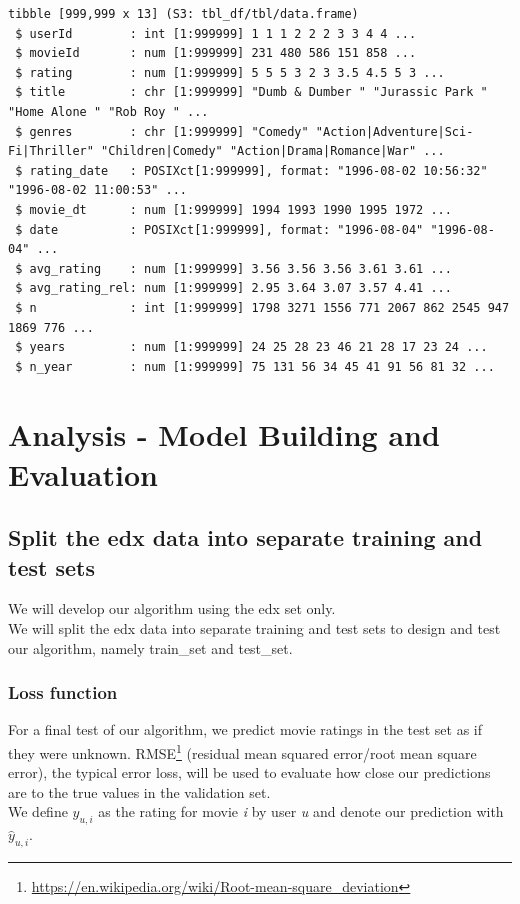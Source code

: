 \documentclass[
]{article}
\DeclareRobustCommand{\href}[2]{#2\footnote{\url{#1}}}
\begin{document}
\begin{verbatim}
tibble [999,999 x 13] (S3: tbl_df/tbl/data.frame)
 $ userId        : int [1:999999] 1 1 1 2 2 2 3 3 4 4 ...
 $ movieId       : num [1:999999] 231 480 586 151 858 ...
 $ rating        : num [1:999999] 5 5 5 3 2 3 3.5 4.5 5 3 ...
 $ title         : chr [1:999999] "Dumb & Dumber " "Jurassic Park " "Home Alone " "Rob Roy " ...
 $ genres        : chr [1:999999] "Comedy" "Action|Adventure|Sci-Fi|Thriller" "Children|Comedy" "Action|Drama|Romance|War" ...
 $ rating_date   : POSIXct[1:999999], format: "1996-08-02 10:56:32" "1996-08-02 11:00:53" ...
 $ movie_dt      : num [1:999999] 1994 1993 1990 1995 1972 ...
 $ date          : POSIXct[1:999999], format: "1996-08-04" "1996-08-04" ...
 $ avg_rating    : num [1:999999] 3.56 3.56 3.56 3.61 3.61 ...
 $ avg_rating_rel: num [1:999999] 2.95 3.64 3.07 3.57 4.41 ...
 $ n             : int [1:999999] 1798 3271 1556 771 2067 862 2545 947 1869 776 ...
 $ years         : num [1:999999] 24 25 28 23 46 21 28 17 23 24 ...
 $ n_year        : num [1:999999] 75 131 56 34 45 41 91 56 81 32 ...
\end{verbatim}

\newpage

\hypertarget{analysis---model-building-and-evaluation}{%
\section{Analysis - Model Building and
Evaluation}\label{analysis---model-building-and-evaluation}}

\hypertarget{split-the-edx-data-into-separate-training-and-test-sets}{%
\subsection{Split the edx data into separate training and test
sets}\label{split-the-edx-data-into-separate-training-and-test-sets}}

We will develop our algorithm using the edx set only.\\
We will split the edx data into separate training and test sets to
design and test our algorithm, namely train\_set and test\_set.

\hypertarget{loss-function}{%
\subsubsection{Loss function}\label{loss-function}}

For a final test of our algorithm, we predict movie ratings in the test
set as if they were unknown.
\href{https://en.wikipedia.org/wiki/Root-mean-square_deviation}{RMSE}
(residual mean squared error/root mean square error), the typical error
loss, will be used to evaluate how close our predictions are to the true
values in the validation set.\\
We define \({y_{u,i}}\) as the rating for movie \emph{i} by user
\emph{u} and denote our prediction with \({\hat{y}_{u,i}}\).
\end{document}
